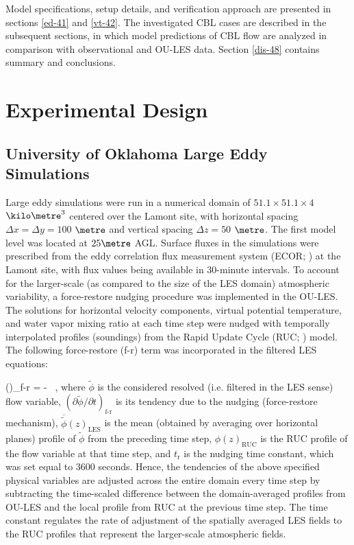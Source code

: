 Model specifications, setup details, and verification approach are presented in sections \autoref{ed-41} and \autoref{vt-42}. The investigated CBL cases are described in the subsequent sections, in which model predictions of CBL flow are analyzed in comparison with observational and OU-LES data. Section \autoref{dis-48} contains summary and conclusions.

\section{Experimental Design}
\label{ed-41}

\subsection{University of Oklahoma Large Eddy Simulations}
\label{les-411}

Large eddy simulations were run in a numerical domain of $51.1 \times 51.1 \times 4$ $\kilo\metre^3$ centered over the Lamont site, with horizontal spacing $\Delta x = \Delta y = 100$ $\metre$ and vertical spacing $\Delta z = 50$ $\metre$. The first model level was located at $25 \mbox {} \metre$ AGL. Surface fluxes in the simulations were prescribed from the eddy correlation flux measurement system (ECOR; \citealt{armECOR}) at the Lamont site, with flux values being available in 30-minute intervals. To account for the larger-scale (as compared to the size of the LES domain) atmospheric variability, a force-restore nudging procedure was implemented in the OU-LES. The solutions for horizontal velocity components, virtual potential temperature, and water vapor mixing ratio at each time step were nudged with temporally interpolated profiles (soundings) from the Rapid Update Cycle (RUC; \citealt{RUC}) model. The following force-restore (f-r) term was incorporated in the filtered LES equations:


\be
\left(\right)_{\textrm{f-r}} = -  \mbox{ ,}
\ee
\noindent
where $\tilde{\phi}$ is the considered resolved (i.e. filtered in the LES sense) flow variable, $\left(\partial \tilde{\phi} / \partial t\right)_{\textrm{f-r}}$ is its tendency due to the nudging (force-restore mechanism), $\overline{\tilde{\phi}}(z)_{\textrm{LES}}$ is the mean (obtained by averaging over horizontal planes) profile of $\tilde{\phi}$ from the preceding time step, $\phi(z)_{\textrm{RUC}}$ is the RUC profile of the flow variable at that time step, and $t_{\textrm{r}}$ is the nudging time constant, which was set equal to $3600$ seconds. Hence, the tendencies of the above specified physical variables are adjusted across the entire domain every time step by subtracting the time-scaled difference between the domain-averaged profiles from OU-LES and the local profile from RUC at the previous time step. The time constant regulates the rate of adjustment of the spatially averaged LES fields to the RUC profiles that represent the larger-scale atmospheric fields.

